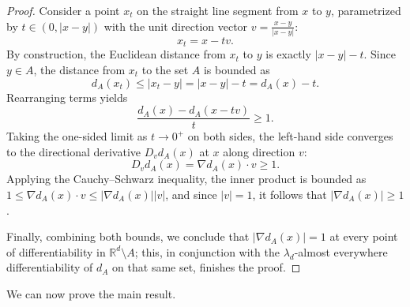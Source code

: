 \documentclass[12pt]{article}
\newcommand{\RR}{\mathbb{R}}
\begin{document}
\begin{proof}
Consider a point $x_t$ on the straight line segment from $x$ to $y$, parametrized
by $t \in (0, |x-y|)$ with the unit direction vector $v = \frac{x - y}{|x - y|}$:
\begin{equation*}
x_t = x - tv.
\end{equation*}
By construction, the Euclidean distance from $x_t$ to $y$ is exactly $|x - y| - t$. Since
$y \in A$, the distance from $x_t$ to the set $A$ is bounded as
%
\begin{equation*}
d_A(x_t) \leq |x_t - y| = |x - y| - t = d_A(x) - t.
\end{equation*}
%
Rearranging terms yields
%
\begin{equation*}
\frac{d_A(x) - d_A(x - tv)}{t} \geq 1.
\end{equation*}
Taking the one-sided limit as $t \to 0^+$ on both sides, the left-hand side converges to the
directional derivative $D_v d_A(x)$ at $x$ along direction $v$:
\begin{equation*}
D_v d_A(x) = \nabla d_A(x) \cdot v \geq 1.
\end{equation*}
Applying the Cauchy--Schwarz inequality, the inner product is bounded as
$1 \leq \nabla d_A(x) \cdot v \leq |\nabla d_A(x)||v|$, and since $|v| = 1$, it follows that
$|\nabla d_A(x)| \geq 1$.

Finally, combining both bounds, we conclude that $|\nabla d_A(x)| = 1$ at every point of differentiability
in $\RR^d \setminus A$; this, in conjunction with the $\lambda_d$-almost everywhere differentiability of $d_A$ on that same set, finishes the proof.
\end{proof}

We can now prove the main result.
\end{document}
